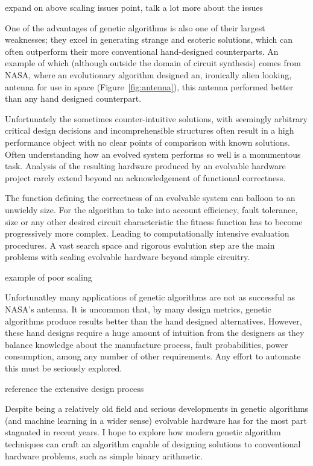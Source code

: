 \todo expand on above scaling issues point, talk a lot more about the issues

One of the advantages of genetic algorithms is also one of their largest
weaknesses; they excel in generating strange and esoteric solutions,
which can often outperform their more conventional hand-designed counterparts.
An example of which (although outside the domain of circuit synthesis)
comes from NASA, where an evolutionary algorithm designed an, ironically
alien looking, antenna for use in space (Figure~\ref{fig:antenna})\cite{Antenna}, this antenna performed better
than any hand designed counterpart.

Unfortunately the sometimes counter-intuitive solutions, with seemingly arbitrary
critical design decisions and incomprehensible structures often result in a high
performance object with no clear points of
comparison with known solutions. Often understanding how an evolved system
performs so well is a monumentous task. Analysis of the resulting hardware
produced by an evolvable hardware project rarely
extend beyond an acknowledgement of functional correctness.

The function defining the correctness of an evolvable system can balloon
to an unwieldy size. For the algorithm to take into account efficiency, fault tolerance, size
or any other desired circuit characteristic the fitness function has to
become progressively more complex. Leading to computationally intensive
evaluation procedures. A vast search space and rigorous evalution step
are the main problems with scaling evolvable hardware beyond simple circuitry.

\todo example of poor scaling

Unfortunatley many applications of genetic algorithms are not as
successful as NASA's antenna.
It is uncommon that, by many design metrics, genetic algorithms produce results
better than the hand designed alternatives. However, these hand designs require
a huge amount of intuition from the designers as they balance
knowledge about the manufacture process, fault probabilities, power
consumption, among any number of other requirements. Any effort to automate
this must be seriously explored.

\todo reference the extensive design process

Despite being a relatively old field and serious developments in genetic
algorithms (and machine learning in a wider sense) evolvable hardware has for
the most part stagnated in recent years. I hope to explore how modern
genetic algorithm techniques can craft an algorithm capable of designing solutions
to conventional hardware problems, such as simple binary arithmetic.


